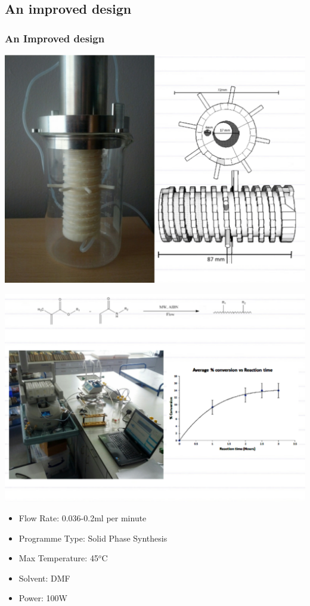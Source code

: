 \documentclass[10pt, compress]{beamer}
\begin{document}
\subsection{An improved design}
\begin{frame}
\frametitle{An Improved design}\vspace{-1cm}
\includegraphics[width=\textwidth]{improvdesign.PNG}
\end{frame}

\begin{frame}
\includegraphics[width=\textwidth]{simpleuse.PNG}
\begin{itemize}
    \item {Flow Rate: 0.036-0.2ml per minute}
    \item {Programme Type: Solid Phase Synthesis}
    \item {Max Temperature: 45$^o$C}
    \item {Solvent: DMF}
    \item {Power: 100W}
\end{itemize}
\end{frame}
\end{document}
